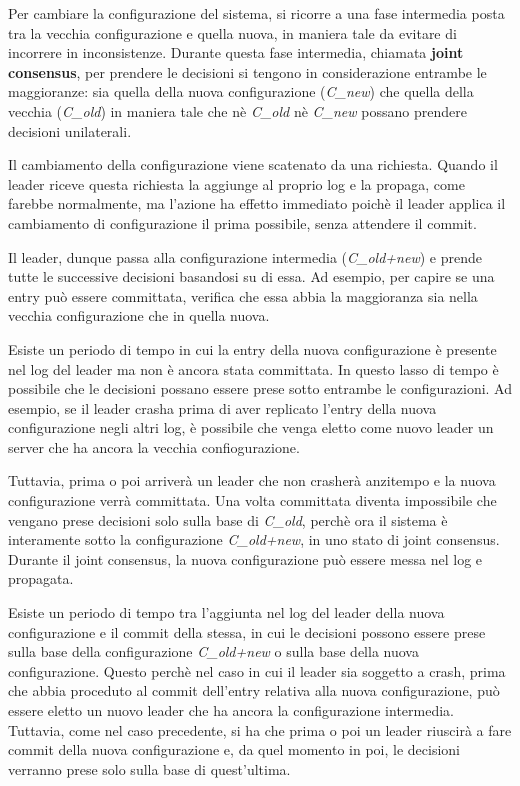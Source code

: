 Per cambiare la configurazione del sistema, si ricorre a una fase intermedia posta tra la vecchia configurazione e quella nuova, in maniera tale da evitare di incorrere in inconsistenze.
Durante questa fase intermedia, chiamata \textbf{joint consensus}, per prendere le decisioni si tengono in considerazione entrambe le maggioranze: sia quella della nuova configurazione (\textit{C\_new}) che quella della vecchia (\textit{C\_old}) in maniera tale che nè \textit{C\_old} nè \textit{C\_new} possano prendere decisioni unilaterali.

Il cambiamento della configurazione viene scatenato da una richiesta. Quando il leader riceve questa richiesta la aggiunge al proprio log e la propaga, come farebbe normalmente, ma l'azione ha effetto immediato poichè il leader applica il cambiamento di configurazione il prima possibile, senza attendere il commit.
 
Il leader, dunque passa alla configurazione intermedia (\textit{C\_old+new}) e prende tutte le successive decisioni basandosi su di essa. Ad esempio, per capire se una entry può essere committata, verifica che essa abbia la maggioranza sia nella vecchia configurazione che in quella nuova.

Esiste un periodo di tempo in cui la entry della nuova configurazione è presente nel log del leader ma non è ancora stata committata. 
In questo lasso di tempo è possibile che le decisioni possano essere prese sotto entrambe le configurazioni. Ad esempio, se il leader crasha prima di aver replicato l'entry della nuova configurazione negli altri log, è possibile che venga eletto come nuovo leader un server che ha ancora la vecchia confiogurazione. 

Tuttavia, prima o poi arriverà un leader che non crasherà anzitempo e la nuova configurazione verrà committata. 
Una volta committata diventa impossibile che vengano prese decisioni solo sulla base di \textit{C\_old}, perchè ora il sistema è interamente sotto la configurazione \textit{C\_old+new}, in uno stato di joint consensus.
Durante il joint consensus, la nuova configurazione può essere messa nel log e propagata.

Esiste un periodo di tempo tra l'aggiunta nel log del leader della nuova configurazione e il commit della stessa, in cui le decisioni possono essere prese sulla base della configurazione \textit{C\_old+new} o sulla base della nuova configurazione. 
Questo perchè nel caso in cui il leader sia soggetto a crash, prima che abbia proceduto al commit dell'entry relativa alla nuova configurazione, può essere eletto un nuovo leader che ha ancora la configurazione intermedia. Tuttavia, come nel caso precedente, si ha che prima o poi un leader riuscirà a fare commit della nuova configurazione e, da quel momento in poi, le decisioni verranno prese solo sulla base di quest'ultima. 


